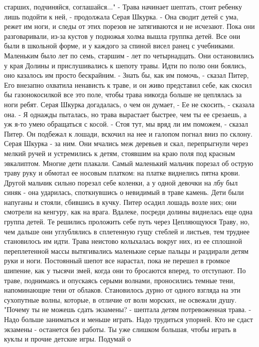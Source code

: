 старших, подчиняйся, соглашайся..."
    - Трава начинает шептать, стоит ребенку лишь подойти к ней, - 
продолжала Серая Шкурка. - Она сводит детей с ума, режет им ноги, и 
следы от этих порезов не затягиваются и не исчезают.
    Пока они разговаривали, из-за кустов у подножья холма вышла 
группка детей. Все они были в школьной форме, и у каждого за спиной 
висел ранец с учебниками. Маленьким было лет по семь, старшим - лет по 
четырнадцать. Они остановились у края Долины и прислушивались к шепоту 
травы. Идти по полю они боялись, оно казалось им просто бескрайним.
    - Знать бы, как им помочь, - сказал Питер, Его внезапно охватила 
ненависть к траве, и он живо представил себе, как скосил бы 
газонокосилкой все это поле, чтобы трава никогда больше не цеплялась 
за ноги ребят.
    Серая Шкурка догадалась, о чем он думает,
    - Ее не скосить, - сказала она. - Я однажды пыталась, но трава 
вырастает быстрее, чем ты ее срезаешь, а уж я-то умею обращаться с 
косой.
    - Стоя тут, мы вряд ли им поможем, - сказал Питер.
    Он подбежал к лошади, вскочил на нее и галопом погнал вниз по 
склону. Серая Шкурка - за ним. Они мчались меж деревьев и скал, 
перепрыгнули через мелкий ручей и устремились к детям, стоявшим на 
краю поля под красным эвкалиптом. Многие дети плакали. Самый маленький 
мальчик порезал об острую траву руку и обмотал ее носовым платком: на 
платке виднелись пятна крови. Другой мальчик сильно порезал себе 
коленки, а у одной девочки на лбу был синяк - она ударилась, 
споткнувшись о невидимый в траве камень. Дети были напуганы и стояли, 
сбившись в кучку. Питер осадил лошадь возле них; они смотрели на 
кенгуру, как на врага.
    Вдалеке, посреди долины виднелась еще одна группа детей. Те 
решились проложить себе путь через Цепляющуюся Траву, но, чем дальше 
они углублялись в сплетенную гущу стеблей и листьев, тем труднее 
становилось им идти. Трава неистово колыхалась вокруг них, из ее 
сплошной переплетенной массы вытягивались маленькие серые пальцы и 
раздирали детям руки и ноги. Постоянный шепот все нарастал, пока не 
перешел в громкое шипение, как у тысячи змей, когда они то бросаются 
вперед, то отступают.
    По траве, поднимаясь и опускаясь серыми волнами, проносились 
темные тени, напоминающие тени от облаков. Становилось дурно от одного 
взгляда на эти сухопутные волны, которые, в отличие от волн морских, 
не освежали душу.
    "Почему ты не можешь сдать экзамены? - шептала детям потревоженная 
трава. - Надо больше заниматься и меньше играть. Надо трудиться 
упорней. Кто не сдаст экзамены - останется без работы. Ты уже слишком 
большая, чтобы играть в куклы и прочие детские игры. Подумай о 
